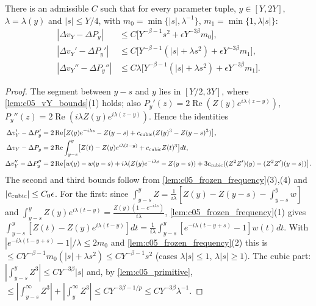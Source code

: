 \begin{lemma}
  \label{lem:c05_plane_wave_comparison}
  There is an admissible $C$ such that for every parameter tuple, $y\in[Y,2Y]$, $\lambda=\lambda(y)$ and $|s|\le Y/4$, with
  $m_0=\min\{|s|,\lambda^{-1}\}$, $m_1=\min\{1,\lambda|s|\}$:
  \begin{equation}\label{eqn:approx_vY_plane_wave_comparison}
  \begin{aligned}
    |\Delta v_Y-\Delta P_y|&\le C\bigl[Y^{-\beta-1}s^2+\epsilon Y^{-3\beta}m_0\bigr],\\
    |\Delta v_Y'-\Delta P_y'|&\le C\bigl[Y^{-\beta-1}(|s|+\lambda s^2)+\epsilon Y^{-3\beta}m_1\bigr],\\
    |\Delta v_Y''-\Delta P_y''|&\le C\lambda\bigl[Y^{-\beta-1}(|s|+\lambda s^2)+\epsilon Y^{-3\beta}m_1\bigr].
  \end{aligned}
  \end{equation}
\end{lemma}
\begin{proof}
  The segment between $y-s$ and $y$ lies in $[Y/2,3Y]$, where \cref{lem:c05_vY_bounds}(1) holds; also
  $P_y'(z)=2\operatorname{Re}(Z(y)e^{i\lambda(z-y)})$, $P_y''(z)=2\operatorname{Re}(i\lambda Z(y)e^{i\lambda(z-y)})$. Hence the identities
  \begin{align}
    \Delta v_Y'-\Delta P_y'&=2\operatorname{Re}\bigl[Z(y)e^{-i\lambda s}-Z(y-s)+c_{\textup{cubic}}(Z(y)^3-Z(y-s)^3)\bigr],\label{eqn:approx_vY_slope_comparison_identity}\\
    \Delta v_Y-\Delta P_y&=2\operatorname{Re}\int_{y-s}^y\bigl[Z(t)-Z(y)e^{i\lambda(t-y)}+c_{\textup{cubic}}Z(t)^3\bigr]dt,\label{eqn:approx_vY_value_comparison_identity}\\
    \Delta v_Y''-\Delta P_y''&=2\operatorname{Re}\bigl[w(y)-w(y-s)+i\lambda(Z(y)e^{-i\lambda s}-Z(y-s))+3c_{\textup{cubic}}((Z^2Z')(y)-(Z^2Z')(y-s))\bigr].\notag
  \end{align}
  The second and third bounds follow from \cref{lem:c05_frozen_frequency}(3),(4) and $|c_{\textup{cubic}}|\le C_0\epsilon$.
  For the first: since $\int_{y-s}^yZ=\frac1{i\lambda}[Z(y)-Z(y-s)-\int_{y-s}^yw]$ and
  $\int_{y-s}^yZ(y)e^{i\lambda(t-y)}=\frac{Z(y)(1-e^{-i\lambda s})}{i\lambda}$, \cref{lem:c05_frozen_frequency}(1) gives
  $\int_{y-s}^y[Z(t)-Z(y)e^{i\lambda(t-y)}]dt=\frac1{i\lambda}\int_{y-s}^y[e^{-i\lambda(t-y+s)}-1]w(t)dt$. With
  $|e^{-i\lambda(t-y+s)}-1|/\lambda\le2m_0$ and \cref{lem:c05_frozen_frequency}(2) this is $\le CY^{-\beta-1}m_0(|s|+\lambda s^2)\le CY^{-\beta-1}s^2$
  (cases $\lambda|s|\le1$, $\lambda|s|\ge1$). The cubic part: $|\int_{y-s}^yZ^3|\le CY^{-3\beta}|s|$ and, by \cref{lem:c05_primitive},
  $\le|\int_{y-s}^\infty Z^3|+|\int_y^\infty Z^3|\le CY^{-3\beta-1/p}\le CY^{-3\beta}\lambda^{-1}$.
\end{proof}

